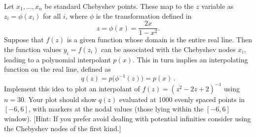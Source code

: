 \begin{exercise}

	Let $x_1,\ldots,x_n$ be standard Chebyshev points. These map to the $z$
	variable as $z_i=\phi(x_i)$ for all $i$, where $\phi$ is the transformation
	defined in
	\[
		z = \phi(x) = \frac{2x}{1-x^2}.
	\]
	Suppose that $f(z)$ is a given function whose domain is the entire real line.
	Then the function values $y_i=f(z_i)$ can be associated with the Chebyshev nodes
	$x_i$, leading to a polynomial interpolant $p(x)$. This in turn implies an
	interpolating function on the real line, defined as
	\[
		q(z)=p\bigl(\phi^{-1}(z)\bigr) = p(x)\,.
	\]
	Implement this idea to plot an interpolant of $f(z)=(z^2-2z+2)^{-1}$ using
	$n=30$. Your plot should show $q(z)$ evaluated at 1000 evenly spaced points in
	$[-6,6]$, with markers at the nodal values (those lying within the $[-6,6]$
	window). [Hint: If you prefer avoid dealing with potential infinities consider
			using the Chebyshev nodes of the first kind.]

\end{exercise}

